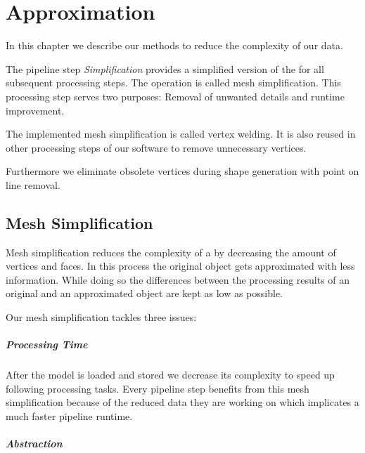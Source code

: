 \documentclass[../ClassicThesis.tex]{subfiles}
\begin{document}
\chapter{Approximation}\label{ch:appropximation}


\newcommand\myNotes[1]{\textcolor{red}{#1}}


In this chapter we describe our methods to reduce the complexity of our data. 

The pipeline step \emph{Simplification} provides a simplified version of the {\threedmodel} for all subsequent processing steps. The operation is called mesh simplification. This processing step serves two purposes: Removal of unwanted details and runtime improvement.

The implemented mesh simplification is called vertex welding. It is also reused in other processing steps of our software to remove unnecessary vertices.

Furthermore we eliminate obsolete vertices during shape generation with point on line removal.


\section{Mesh Simplification}


Mesh simplification reduces the complexity of a {\threedmodel} by decreasing the amount of vertices and faces. In this process the original object gets approximated with less information. While doing so the differences between the processing results of an original and an approximated object are kept as low as possible. 

Our mesh simplification tackles three issues:

\paragraph*{Processing Time}

After the model is loaded and stored we decrease its complexity to speed up following processing tasks. Every pipeline step benefits from this mesh simplification because of the reduced data they are working on which implicates a much faster pipeline runtime. 

\paragraph*{Abstraction}
\end{document}
